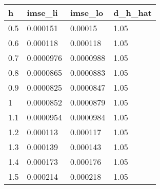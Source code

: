\begin{tabular}{llll}
  \hline
h & imse\_li & imse\_lo & d\_h\_hat \\ 
  \hline
0.5 & 0.000151 & 0.00015 & 1.05 \\ 
  0.6 & 0.000118 & 0.000118 & 1.05 \\ 
  0.7 & 0.0000976 & 0.0000988 & 1.05 \\ 
  0.8 & 0.0000865 & 0.0000883 & 1.05 \\ 
  0.9 & 0.0000825 & 0.0000847 & 1.05 \\ 
  1 & 0.0000852 & 0.0000879 & 1.05 \\ 
  1.1 & 0.0000954 & 0.0000984 & 1.05 \\ 
  1.2 & 0.000113 & 0.000117 & 1.05 \\ 
  1.3 & 0.000139 & 0.000143 & 1.05 \\ 
  1.4 & 0.000173 & 0.000176 & 1.05 \\ 
  1.5 & 0.000214 & 0.000218 & 1.05 \\ 
   \hline
\end{tabular}
